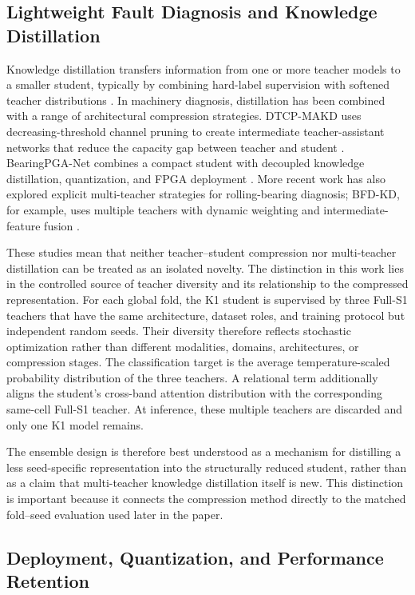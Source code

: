 \subsection{Lightweight Fault Diagnosis and Knowledge Distillation}
\label{subsec:kd}

Knowledge distillation transfers information from one or more teacher models to a smaller student, typically by combining hard-label supervision with softened teacher distributions \citep{Hinton2015Distilling}. In machinery diagnosis, distillation has been combined with a range of architectural compression strategies. DTCP-MAKD uses decreasing-threshold channel pruning to create intermediate teacher-assistant networks that reduce the capacity gap between teacher and student \citep{Zhong2024DTCPMAKD}. BearingPGA-Net combines a compact student with decoupled knowledge distillation, quantization, and FPGA deployment \citep{Liao2024BearingPGANet}. More recent work has also explored explicit multi-teacher strategies for rolling-bearing diagnosis; BFD-KD, for example, uses multiple teachers with dynamic weighting and intermediate-feature fusion \citep{Sun2026BFDKD}.

These studies mean that neither teacher--student compression nor multi-teacher distillation can be treated as an isolated novelty. The distinction in this work lies in the controlled source of teacher diversity and its relationship to the compressed representation. For each global fold, the K1 student is supervised by three Full-S1 teachers that have the same architecture, dataset roles, and training protocol but independent random seeds. Their diversity therefore reflects stochastic optimization rather than different modalities, domains, architectures, or compression stages. The classification target is the average temperature-scaled probability distribution of the three teachers. A relational term additionally aligns the student's cross-band attention distribution with the corresponding same-cell Full-S1 teacher. At inference, these multiple teachers are discarded and only one K1 model remains.

The ensemble design is therefore best understood as a mechanism for distilling a less seed-specific representation into the structurally reduced student, rather than as a claim that multi-teacher knowledge distillation itself is new. This distinction is important because it connects the compression method directly to the matched fold--seed evaluation used later in the paper.

\subsection{Deployment, Quantization, and Performance Retention}
\label{subsec:deployment}

